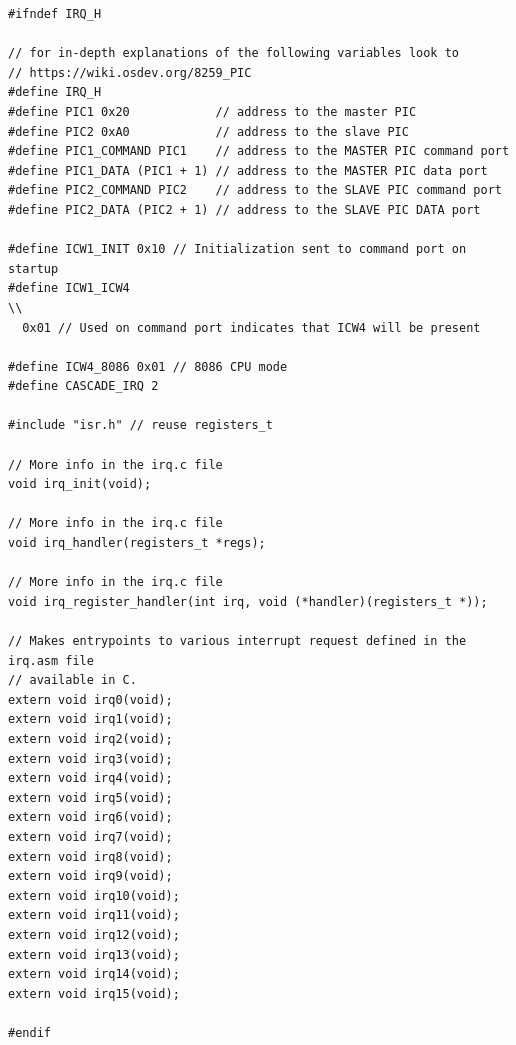 \documentclass[../main.tex]{subfiles}
\begin{document}
\label{lst:irq_h}
\begin{verbatim}
#ifndef IRQ_H

// for in-depth explanations of the following variables look to
// https://wiki.osdev.org/8259_PIC
#define IRQ_H
#define PIC1 0x20            // address to the master PIC
#define PIC2 0xA0            // address to the slave PIC
#define PIC1_COMMAND PIC1    // address to the MASTER PIC command port
#define PIC1_DATA (PIC1 + 1) // address to the MASTER PIC data port
#define PIC2_COMMAND PIC2    // address to the SLAVE PIC command port
#define PIC2_DATA (PIC2 + 1) // address to the SLAVE PIC DATA port

#define ICW1_INIT 0x10 // Initialization sent to command port on startup
#define ICW1_ICW4                                                              \\
  0x01 // Used on command port indicates that ICW4 will be present

#define ICW4_8086 0x01 // 8086 CPU mode
#define CASCADE_IRQ 2

#include "isr.h" // reuse registers_t

// More info in the irq.c file
void irq_init(void);

// More info in the irq.c file
void irq_handler(registers_t *regs);

// More info in the irq.c file
void irq_register_handler(int irq, void (*handler)(registers_t *));

// Makes entrypoints to various interrupt request defined in the irq.asm file
// available in C.
extern void irq0(void);
extern void irq1(void);
extern void irq2(void);
extern void irq3(void);
extern void irq4(void);
extern void irq5(void);
extern void irq6(void);
extern void irq7(void);
extern void irq8(void);
extern void irq9(void);
extern void irq10(void);
extern void irq11(void);
extern void irq12(void);
extern void irq13(void);
extern void irq14(void);
extern void irq15(void);

#endif

\end{verbatim}
\end{document}

